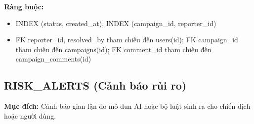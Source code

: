 \textbf{Ràng buộc:}
\begin{itemize}
    \item INDEX (status, created\_\allowbreak{}at), INDEX (campaign\_\allowbreak{}id, reporter\_\allowbreak{}id)
    \item FK reporter\_\allowbreak{}id, resolved\_\allowbreak{}by tham chiếu đến users(id); FK campaign\_\allowbreak{}id tham chiếu đến campaigns(id); FK comment\_\allowbreak{}id tham chiếu đến campaign\_\allowbreak{}comments(id)
\end{itemize}

\subsection{RISK\_\allowbreak{}ALERTS (Cảnh báo rủi ro)}

\textbf{Mục đích:} Cảnh báo gian lận do mô-đun AI hoặc bộ luật sinh ra cho chiến dịch hoặc người dùng.

